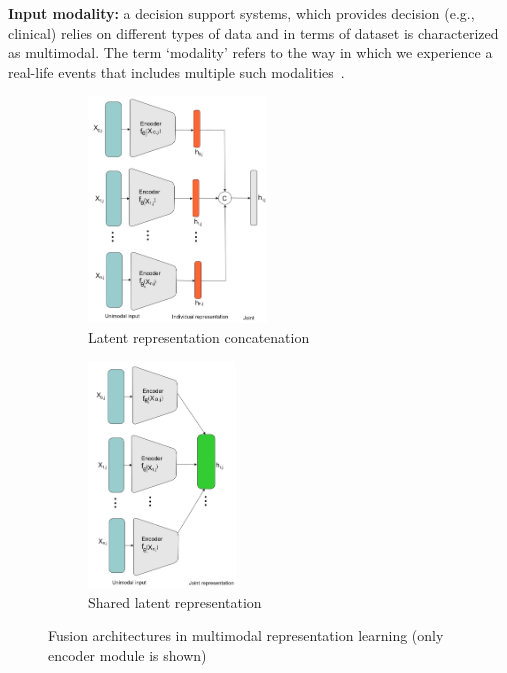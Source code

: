 \vspace{-2mm}
\begin{tcolorbox}[colback=white!3!white,colframe=gray!120!black,title=\faBook~Input modality]
    \scriptsize{
        \textbf{Input modality:} a decision support systems, which provides decision (e.g., clinical) relies on different types of data and in terms of dataset is characterized as multimodal. The term `modality' refers to the way in which we experience a real-life events that includes multiple such modalities~\cite{mmsurvey}.
        }
\end{tcolorbox}

\begin{figure}[htp!]
	\centering
	\begin{subfigure}{.48\linewidth}
		\centering
		\includegraphics[width=0.9\linewidth,height=60mm]{images/rl_1.png}
		\caption{Latent representation concatenation}
        \label{fig:lrc_1}
	\end{subfigure}
	\begin{subfigure}{0.48\linewidth}
		\centering
		\includegraphics[width=0.9\linewidth,height=60mm]{images/shared.png}
		\caption{Shared latent representation}
        \label{fig:slr_1}
	\end{subfigure}
	\caption{Fusion architectures in multimodal representation learning (only encoder module is shown)} 
	\label{fig:mm_rL_example}
\end{figure}

